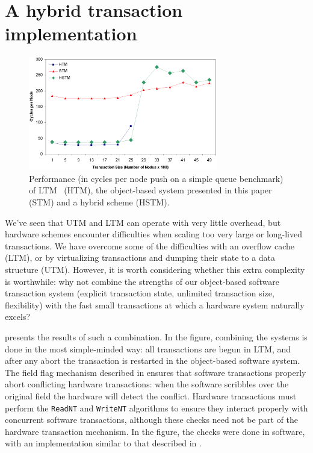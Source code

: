 \section{A hybrid transaction implementation}\label{sec:hybrid}

\begin{figure}\begin{center}%
\includegraphics[width=3.25in,clip=true]{Figures/sean_lie_6b}%
\end{center}%
\caption[Hybrid performance on simple queue benchmark.]
{Performance (in cycles per node push on a simple queue
  benchmark) of LTM~\cite{AnanianAsKuLeLi04} (HTM), the
  object-based system presented in this paper (STM) and a hybrid
  scheme (HSTM).}%
\label{fig:hybrid}%
\end{figure}

We've seen that UTM and LTM can operate
with very little overhead, but hardware schemes encounter difficulties
when scaling too very large or long-lived transactions.  We have overcome
some of the difficulties with an overflow
cache (LTM), or by virtualizing transactions and dumping their
state to a data structure (UTM).  However, it is worth
considering whether this extra complexity is worthwhile: why not
combine the strengths of our object-based software transaction system
(explicit transaction state, unlimited transaction size, flexibility)
with the fast small transactions at which a hardware system naturally excels?

 presents the results of such a combination.
In the figure, combining the systems is done
in the most simple-minded way: all transactions are begun in
LTM,
and after any abort the transaction is restarted in the
object-based software system.
  The field flag mechanism described in
 ensures that software transactions properly abort
conflicting hardware transactions: when the software scribbles
\FLAG over the original field the hardware will detect the conflict.
Hardware transactions must perform
the \texttt{ReadNT} and \texttt{WriteNT} algorithms to ensure they
interact properly with concurrent software transactions, although these
checks need not be part of the hardware transaction mechanism.
In the figure, the checks were done in software, with an implementation
similar to that described in .

